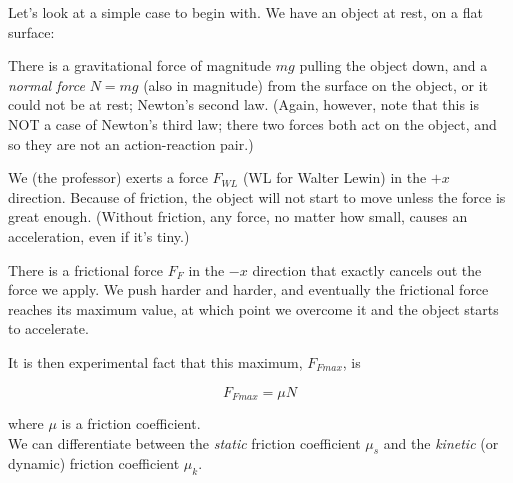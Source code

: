 Let's look at a simple case to begin with. We have an object at rest, on a flat surface:

\begin{figure}[H]
  \centering
{}
\end{figure}


There is a gravitational force of magnitude $m g$ pulling the object down, and a \emph{normal force} $N = m g$ (also in magnitude) from the surface on the object, or it could not be at rest; Newton's second law. (Again, however, note that this is NOT a case of Newton's third law; there two forces both act on the object, and so they are not an action-reaction pair.)

We (the professor) exerts a force $F_{WL}$ (WL for Walter Lewin) in the $+x$ direction. Because of friction, the object will not start to move unless the force is great enough. (Without friction, any force, no matter how small, causes an acceleration, even if it's tiny.)

There is a frictional force $F_F$ in the $-x$ direction that exactly cancels out the force we apply. We push harder and harder, and eventually the frictional force reaches its maximum value, at which point we overcome it and the object starts to accelerate.

It is then experimental fact that this maximum, $F_{Fmax}$, is

\begin{equation}
F_{Fmax} = \mu N
\end{equation}

where $\mu$ is a friction coefficient.\\
We can differentiate between the \emph{static} friction coefficient $\mu_s$ and the \emph{kinetic} (or dynamic) friction coefficient $\mu_k$.

